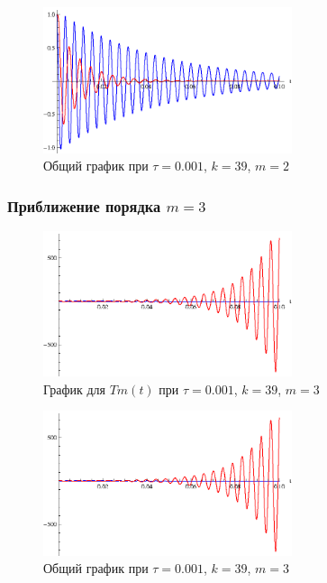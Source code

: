 \begin{figure}[h]
\begin{center}
\includegraphics[width=0.65\textwidth]{./3_results/3_5.eps}
\end{center}
\caption{Общий график при $\tau=0.001$, $k=39$, $m=2$}
\end{figure}

\newpage

\subsubsection{Приближение порядка $m=3$}

\begin{figure}[h]
\begin{center}
\includegraphics[width=0.65\textwidth]{./3_results/3_6.eps}
\end{center}
\caption{График для $Tm(t)$ при $\tau=0.001$, $k=39$, $m=3$}
\end{figure}

\begin{figure}[h]
\begin{center}
\includegraphics[width=0.65\textwidth]{./3_results/3_7.eps}
\end{center}
\caption{Общий график при $\tau=0.001$, $k=39$, $m=3$}
\end{figure}

